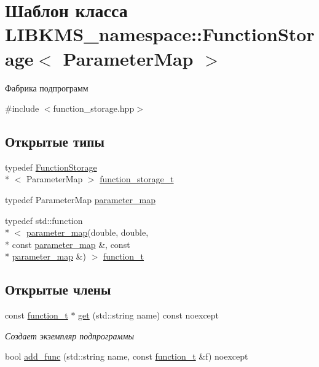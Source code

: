 \hypertarget{classLIBKMS__namespace_1_1FunctionStorage}{\section{Шаблон класса L\-I\-B\-K\-M\-S\-\_\-namespace\-:\-:Function\-Storage$<$ Parameter\-Map $>$}
\label{classLIBKMS__namespace_1_1FunctionStorage}
}


Фабрика подпрограмм  




{\ttfamily \#include $<$function\-\_\-storage.\-hpp$>$}

\subsection*{Открытые типы}
\begin{DoxyCompactItemize}
\item 
typedef \hyperlink{classLIBKMS__namespace_1_1FunctionStorage}{Function\-Storage}\\*
$<$ Parameter\-Map $>$ \hyperlink{classLIBKMS__namespace_1_1FunctionStorage_abf20e17be0153dc6aafcbb501b28ef1e}{function\-\_\-storage\-\_\-t}
\item 
typedef Parameter\-Map \hyperlink{classLIBKMS__namespace_1_1FunctionStorage_a82b240ff1d5e266642cadfdebd37dfa2}{parameter\-\_\-map}
\item 
typedef std\-::function\\*
$<$ \hyperlink{classLIBKMS__namespace_1_1FunctionStorage_a82b240ff1d5e266642cadfdebd37dfa2}{parameter\-\_\-map}(double, double, \\*
const \hyperlink{classLIBKMS__namespace_1_1FunctionStorage_a82b240ff1d5e266642cadfdebd37dfa2}{parameter\-\_\-map} \&, const \\*
\hyperlink{classLIBKMS__namespace_1_1FunctionStorage_a82b240ff1d5e266642cadfdebd37dfa2}{parameter\-\_\-map} \&) $>$ \hyperlink{classLIBKMS__namespace_1_1FunctionStorage_a0319ecd6e0ca02ee509c5f6b6edeb072}{function\-\_\-t}
\end{DoxyCompactItemize}
\subsection*{Открытые члены}
\begin{DoxyCompactItemize}
\item 
const \hyperlink{classLIBKMS__namespace_1_1FunctionStorage_a0319ecd6e0ca02ee509c5f6b6edeb072}{function\-\_\-t} $\ast$ \hyperlink{classLIBKMS__namespace_1_1FunctionStorage_a6dfe25e5323f360651074cf35b311c06}{get} (std\-::string name) const noexcept
\begin{DoxyCompactList}\small\item\em Создает экземпляр подпрограммы \end{DoxyCompactList}\item 
bool \hyperlink{classLIBKMS__namespace_1_1FunctionStorage_ad08fe0eaf20dc1c35645b9242bb574cf}{add\-\_\-func} (std\-::string name, const \hyperlink{classLIBKMS__namespace_1_1FunctionStorage_a0319ecd6e0ca02ee509c5f6b6edeb072}{function\-\_\-t} \&f) noexcept
\end{DoxyCompactItemize}
